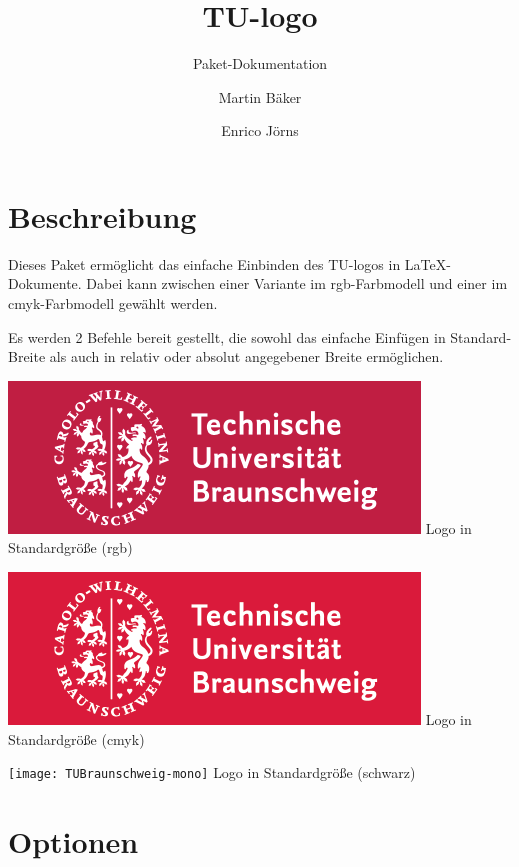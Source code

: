 \documentclass{scrartcl}
\title{TU-logo}
\subtitle{Paket-Dokumentation}
\author{Martin Bäker \and \normalsize Enrico Jörns}
\begin{document}
\maketitle

\section{Beschreibung}

Dieses Paket ermöglicht das einfache Einbinden des TU-logos in \LaTeX-Dokumente.
Dabei kann zwischen einer Variante im rgb-Farbmodell und einer im
cmyk-Farbmodell gewählt werden.

Es werden 2 Befehle bereit gestellt, die sowohl das einfache Einfügen in
Standard-Breite%
als auch in relativ oder absolut angegebener Breite ermöglichen.


\begin{minipage}{0.5\textwidth}
  \centering
  \includegraphics[width=100\tulogoWidth]{TUBraunschweig-rgb}
  {\sffamily Logo in Standardgröße (rgb)}
\end{minipage}
\begin{minipage}{0.5\textwidth}
  \centering
  \includegraphics[width=100\tulogoWidth]{TUBraunschweig-cmyk}
  {\sffamily Logo in Standardgröße (cmyk)}
\end{minipage}

\begin{minipage}{0.5\textwidth}
  \centering
  \texttt{[image: TUBraunschweig-mono]}
  {\sffamily Logo in Standardgröße (schwarz)}
\end{minipage}

\section{Optionen}
\end{document}
